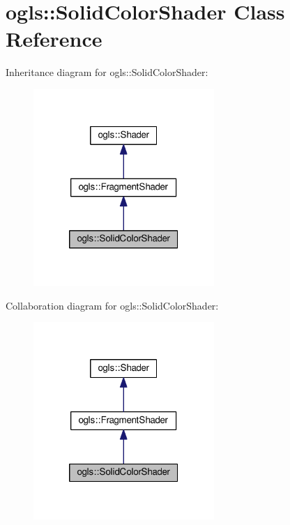 \hypertarget{classogls_1_1SolidColorShader}{\section{ogls\-:\-:Solid\-Color\-Shader Class Reference}
\label{classogls_1_1SolidColorShader}
}


Inheritance diagram for ogls\-:\-:Solid\-Color\-Shader\-:
\nopagebreak
\begin{figure}[H]
\begin{center}
\leavevmode
\includegraphics[width=194pt]{d0/d03/classogls_1_1SolidColorShader__inherit__graph}
\end{center}
\end{figure}


Collaboration diagram for ogls\-:\-:Solid\-Color\-Shader\-:
\nopagebreak
\begin{figure}[H]
\begin{center}
\leavevmode
\includegraphics[width=194pt]{d7/d13/classogls_1_1SolidColorShader__coll__graph}
\end{center}
\end{figure}
